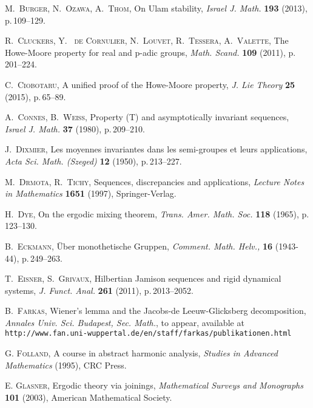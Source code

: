 \documentclass[11pt,english,a4paper]{smfart}
\numberwithin{equation}{section}
\theoremstyle{definition}
\begin{document}
\begin{thebibliography}{99999}
{
\textsc{M.~Burger, N.~Ozawa, A.~Thom,} 
\newblock On Ulam stability,
\newblock \emph{Israel J. Math.} {\bf 193} (2013), p.\,109--129. 

\textsc{R.~Cluckers, Y.~ de Cornulier, N.~Louvet, R.~Tessera, A.~Valette,}
\newblock The Howe-Moore property for real and p-adic groups,
\newblock \emph{Math. Scand.} \textbf{109} (2011), p.\,201--224.

\textsc{C.~Ciobotaru,} 
\newblock A unified proof of the Howe-Moore property,
\newblock \emph{J. Lie Theory} \textbf{25} (2015), p.\,65--89.

\textsc{A.~Connes, B.~Weiss,}
\newblock Property (T) and asymptotically invariant sequences,
\newblock \emph{Israel J. Math.} \textbf{37} (1980), p.\,209--210.

 \textsc{J.~Dixmier,}
\newblock Les moyennes invariantes dans les semi-groupes et leurs 
applications, 
\newblock \emph{Acta Sci. Math. (Szeged)} {\bf 12} (1950), p.\,213--227.

\textsc{M.~Drmota, R.~Tichy},
\newblock Sequences, discrepancies and applications,
\newblock \emph{Lecture Notes in Mathematics} \textbf{1651} (1997), Springer-Verlag. 

 \textsc{H.~Dye,} 
\newblock On the ergodic mixing theorem,
\newblock \emph{Trans. Amer. Math. Soc.} {\bf 118} (1965), p.\,123--130.

 \textsc{B.~Eckmann,} 
\newblock \"Uber monothetische Gruppen, 
\newblock \emph{Comment. Math. Helv.,} {\bf 16} (1943-44), p.\,249--263. 

\textsc{T.~Eisner, S.~Grivaux,}
\newblock Hilbertian Jamison sequences and rigid dynamical systems,
\newblock \emph{J. Funct. Anal.} \textbf{261} (2011), p.\,2013--2052. 

 \textsc{B.~Farkas,}
\newblock Wiener's lemma and the Jacobs-de Leeuw-Glicksberg decomposition,
\newblock \emph{Annales Univ. Sci. Budapest, Sec. Math.}, to appear, 
available at\\ \verb=http://www.fan.uni-wuppertal.de/en/staff/farkas/publikationen.html=

 \textsc{G. Folland,}
\newblock A course in abstract harmonic analysis, \emph{Studies in 
Advanced Mathematics} (1995), CRC Press.

 \textsc{E. Glasner,}
\newblock Ergodic theory via joinings, \emph{Mathematical Surveys and Monographs} \textbf{101} (2003),
American Mathematical Society.

}
\end{thebibliography}
\end{document}
